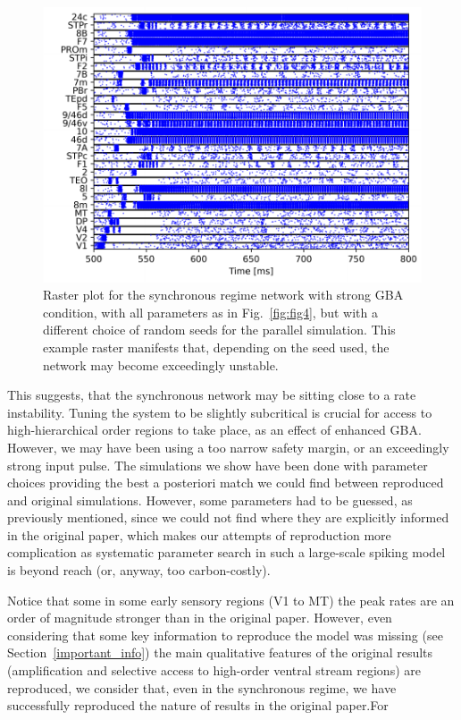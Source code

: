 \begin{figure}[!ht]
 \centering
     \includegraphics[scale=0.6]{figures/figure6.pdf}
 \caption{Raster plot for the synchronous regime network with strong GBA condition, with all parameters as in Fig.~\ref{fig:fig4}, but with a different choice of random seeds for the parallel simulation. This example raster manifests that, depending on the seed used, the network may become exceedingly unstable.}\label{fig:fig5}
\end{figure}

This suggests, that the synchronous network may be sitting close to a rate instability. Tuning the system to be slightly subcritical is crucial for access to high-hierarchical order regions to take place, as an effect of enhanced GBA. However, we may have been using a too narrow safety margin, or an exceedingly strong input pulse. The simulations we show have been done with parameter choices providing the best a posteriori match we could find between reproduced and original simulations. However, some parameters had to be guessed, as previously mentioned, since we could not find where they are explicitly informed in the original paper, which makes our attempts of reproduction more complication as systematic parameter search in such a large-scale spiking model is beyond reach (or, anyway, too carbon-costly).

Notice that some in some early sensory regions (V1 to MT) the peak rates are an order of magnitude stronger than in the original paper. However, even considering that some key information to reproduce the model was missing (see Section~\ref{important_info}) the main qualitative features of the original results (amplification and selective access to high-order ventral stream regions) are reproduced, we consider that, even in the synchronous regime, we have successfully reproduced the nature of results in the original paper.For

